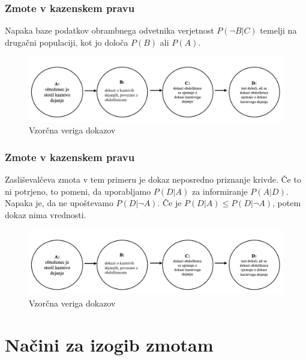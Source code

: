 \documentclass{beamer}
\begin{document}
\begin{frame}
    \frametitle{Zmote v kazenskem pravu}
    \begin{block}{Napaka baze podatkov obrambnega odvetnika}
        verjetnost $P(\neg B \lvert C)$ temelji na drugačni populaciji, kot jo določa $P(B)$ ali $P(A)$.    
    \end{block}
    \begin{figure}[!ht]\label{fig:slika_3}
        \centering
        \includegraphics[scale=0.50]{slika_3.png}
        \caption{Vzorčna veriga dokazov}
    \end{figure}
\end{frame}

\begin{frame}
    \frametitle{Zmote v kazenskem pravu}
    \begin{block}{Zasliševalčeva zmota}
        v tem primeru je dokaz neposredno priznanje krivde. Če to ni potrjeno, to pomeni, da uporabljamo $P(D \lvert A)$ za
        informiranje $P(A \lvert D)$. Napaka je, da ne upoštevamo $P(D \lvert \neg A)$. Če je $P(D \lvert A) \leq P(D \lvert \neg A)$, potem dokaz
        nima vrednosti.    
    \end{block}
    \begin{figure}[!ht]\label{fig:slika_3}
        \centering
        \includegraphics[scale=0.40]{slika_3.png}
        \caption{Vzorčna veriga dokazov}
    \end{figure}
\end{frame}

\section{Načini za izogib zmotam}
\end{document}
